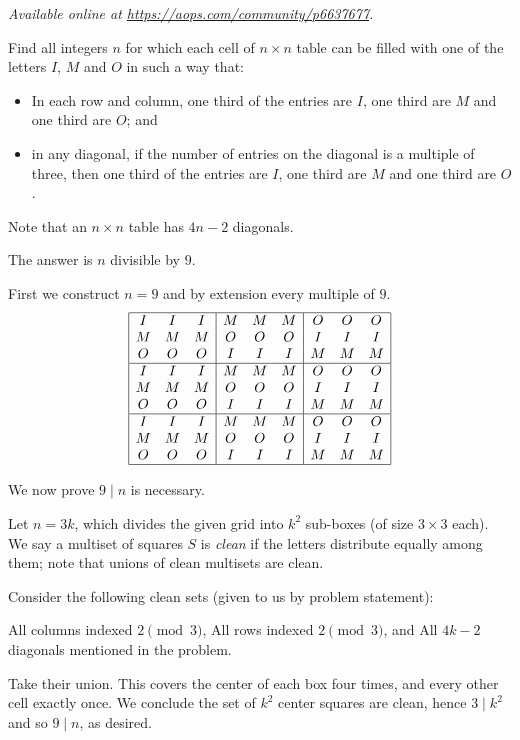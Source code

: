 \textsl{Available online at \url{https://aops.com/community/p6637677}.}
\begin{mdframed}[style=mdpurplebox,frametitle={Problem statement}]
Find all integers $n$ for which each cell of $n \times n$ table
can be filled with one of the letters $I$, $M$ and $O$ in such a way that:
\begin{itemize}
\item In each row and column,  one third of the entries are $I$,
one third are $M$ and one third are $O$; and
\item in any diagonal, if the number of entries on the diagonal is a multiple of three,
then one third of the entries are $I$, one third are $M$ and one third are $O$.
\end{itemize}
Note that an $n \times n$ table has $4n-2$ diagonals.
\end{mdframed}
The answer is $n$ divisible by $9$.

First we construct $n=9$ and by extension every multiple of $9$.
\[
 \begin{array}{|ccc|ccc|ccc|} \hline
  I & I & I & M & M & M & O & O & O \\
  M & M & M & O & O & O & I & I & I \\
  O & O & O & I & I & I & M & M & M \\\hline
  I & I & I & M & M & M & O & O & O \\
  M & M & M & O & O & O & I & I & I \\
  O & O & O & I & I & I & M & M & M \\\hline
  I & I & I & M & M & M & O & O & O \\
  M & M & M & O & O & O & I & I & I \\
  O & O & O & I & I & I & M & M & M \\\hline
 \end{array}
\]

We now prove $9 \mid n$ is necessary.

Let $n = 3k$, which divides the given grid into $k^2$ sub-boxes
(of size $3 \times 3$ each).
We say a multiset of squares $S$ is \emph{clean} if
the letters distribute equally among them;
note that unions of clean multisets are clean.

Consider the following clean sets (given to us by problem statement):
\begin{itemize}
\ii All columns indexed $2 \pmod 3$,
\ii All rows indexed $2 \pmod 3$, and
\ii All $4k-2$ diagonals mentioned in the problem.
\end{itemize}
Take their union.
This covers the center of each box four times,
and every other cell exactly once.
We conclude the set of $k^2$ center squares
are clean, hence $3 \mid k^2$ and so $9 \mid n$,
as desired.

